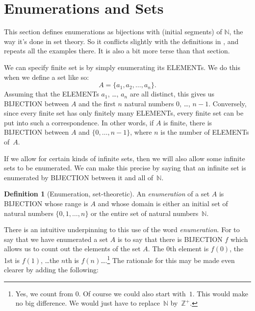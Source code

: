 \documentclass[10pt,a4paper]{article}
\makeatletter
\newcommand*{\olup}[1]{\MakeUppercase{#1}}
\theoremstyle{plain}
\theoremstyle{definition}
\newtheorem{defn}[thm]{Definition}
\theoremstyle{remark}
\newenvironment{explain}{}{}
\newenvironment{editorial}{}{}
\newcommand*{\olfileid}[3]{}
\newcommand*{\olsection}[1]{\section*{#1}}
\newcommand{\olref}{\@ifnextchar[{\olref@i}{\olref@final}}
\def\olref@i[#1]{\@ifnextchar[{\olref@ii}{\olref@final}}
\def\olref@ii[#1]{\@ifnextchar[{\olref@iii}{\olref@final}}
\def\olref@iii[#1]{\olref@final}
\def\olref@final#1{\ref{#1}}
\providecommand{\Nat}{\ensuremath{\mathbb{N}}}
\providecommand{\PosInt}{\mathbb{Z}^{+}}
\makeatother
\begin{document}



\olfileid{sfr}{siz}{enm-alt}

\olsection{Enumerations and  Sets}

\begin{editorial}
  This section defines enumerations as bijections with (initial
  segments) of $\Nat$, the way it's done in set theory. So it
  conflicts slightly with the definitions in \olref[enm]{sec}, and
  repeats all the examples there. It is also a bit more terse than
  that section.
\end{editorial}

We can specify finite set is by simply enumerating its
\olup{element}s. We do this when we define a set like so:
\[
  A = \{a_1, a_2, \ldots, a_n\}.
\]
Assuming that the \olup{element}s $a_1$, \dots, $a_n$ are all distinct,
this gives us \olup{bijection} between $A$ and the first $n$ natural
numbers $0$, \dots, $n-1$. Conversely, since every finite set has only
finitely many \olup{element}s, every finite set can be put into such a
correspondence. In other words, if $A$ is finite, there is
\olup{bijection} between $A$ and $\{0, \dots, n-1\}$, where $n$ is the
number of \olup{element}s of~$A$.

If we allow for certain kinds of infinite sets, then we will also
allow some infinite sets to be enumerated. We can make this precise by
saying that an infinite set is enumerated by \olup{bijection} between it
and all of~$\Nat$.

\begin{defn}[Enumeration, set-theoretic] 
An \emph{enumeration} of a set $A$ is \olup{bijection} whose range is
$A$ and whose domain is either an initial set of natural numbers $\{0,
1, \ldots, n\}$ {or} the entire set of natural numbers~$\Nat$. 
\end{defn}

\begin{explain}
There is an intuitive underpinning to this use of the word
\emph{enumeration}. For to say that we have enumerated a set $A$ is to
say that there is \olup{bijection} $f$ which allows us to count out the
elements of the set $A$. The $0$th element is $f(0)$, the 1st is
$f(1)$, \ldots the $n$th is $f(n)$\ldots.\footnote{Yes, we count
from $0$. Of course we could also start with~$1$. This would
make no big difference. We would just have to replace~$\Nat$
by~$\PosInt$.} The rationale for this may be made even clearer by
adding the following:
\end{explain}
\end{document}
